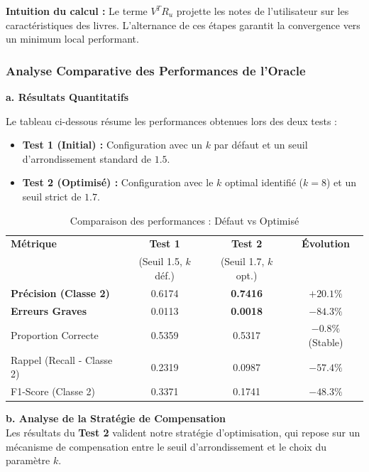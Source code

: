 \documentclass[11pt,a4paper]{article}
\begin{document}
\textbf{Intuition du calcul :} Le terme $V^T R_u$ projette les notes de l'utilisateur sur les caractéristiques des livres. L'alternance de ces étapes garantit la convergence vers un minimum local performant. \citep{takacs2012alternating}


\subsubsection{Analyse Comparative des Performances de l'Oracle}

\textbf{a. Résultats Quantitatifs}

Le tableau ci-dessous résume les performances obtenues lors des deux tests :
\begin{itemize}
    \item \textbf{Test 1 (Initial) :} Configuration avec un $k$ par défaut et un seuil d'arrondissement standard de $1.5$.
    \item \textbf{Test 2 (Optimisé) :} Configuration avec le $k$ optimal identifié ($k=8$) et un seuil strict de $1.7$.
    \\
\end{itemize}

\begin{table}[h!]
    \centering
    \caption{Comparaison des performances : Défaut vs Optimisé}
    \vspace{0.2cm}
    \begin{tabular}{l c c c}
        \toprule
        \textbf{Métrique} & \textbf{Test 1} & \textbf{Test 2} & \textbf{Évolution} \\
        & (Seuil 1.5, $k$ déf.) & (Seuil 1.7, $k$ opt.) & \\
        \midrule
        \textbf{Précision (Classe 2)} & 0.6174 & \textbf{0.7416} & $\mathbf{+20.1\%}$ \\
        \textbf{Erreurs Graves} & 0.0113 & \textbf{0.0018} & $\mathbf{-84.3\%}$ \\
        Proportion Correcte & 0.5359 & 0.5317 & $-0.8\%$ (Stable) \\
        Rappel (Recall - Classe 2) & 0.2319 & 0.0987 & $-57.4\%$ \\
        F1-Score (Classe 2) & 0.3371 & 0.1741 & $-48.3\%$ \\
        \bottomrule
    \end{tabular}
\end{table}

\textbf{b. Analyse de la Stratégie de Compensation}
\\
Les résultats du \textbf{Test 2} valident notre stratégie d'optimisation, qui repose sur un mécanisme de compensation entre le seuil d'arrondissement et le choix du paramètre $k$.
\end{document}
